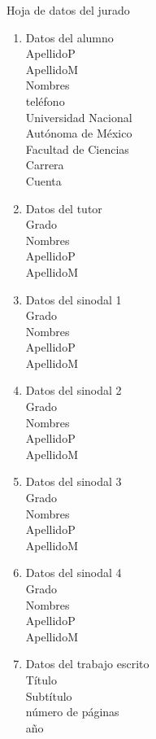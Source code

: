 \thispagestyle{empty}

\begin{center}
  {\LARGE Hoja de datos del jurado}
\end{center}
\begin{multicols*}{2}
  \begin{enumerate}
    \item Datos del alumno\\
          ApellidoP\\
          ApellidoM\\
          Nombres\\
          teléfono\\
          Universidad Nacional\\
          Autónoma de México\\
          Facultad de Ciencias\\
          Carrera\\
          Cuenta
    \item Datos del tutor\\
          Grado\\
          Nombres\\
          ApellidoP\\
          ApellidoM
    \item Datos del sinodal 1\\
          Grado\\
          Nombres\\
          ApellidoP\\
          ApellidoM
    \item Datos del sinodal 2\\
          Grado\\
          Nombres\\
          ApellidoP\\
          ApellidoM
    \item Datos del sinodal 3\\
          Grado\\
          Nombres\\
          ApellidoP\\
          ApellidoM
    \item Datos del sinodal 4\\
          Grado\\
          Nombres\\
          ApellidoP\\
          ApellidoM
    \item Datos del trabajo escrito\\
          Título\\
          Subtítulo\\
          número de páginas\\
          año
  \end{enumerate}
\end{multicols*}
\cleardoublepage
